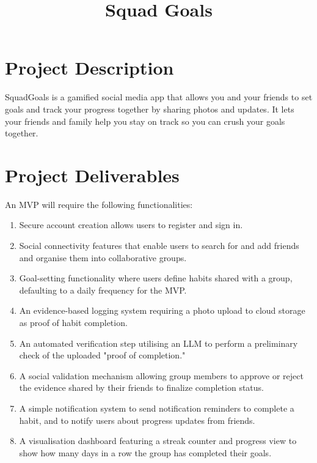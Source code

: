 \title{Squad Goals}

\maketitle
\section*{Project Description}
SquadGoals is a gamified social media app that allows you and your friends to set goals and track your progress together by sharing photos and updates. 
It lets your friends and family help you stay on track so you can crush your goals together.
\section*{Project Deliverables}
An MVP will require the following functionalities:
\begin{enumerate}
\item Secure account creation allows users to register and sign in.
\item Social connectivity features that enable users to search for and add friends and organise them into collaborative groups. 
\item Goal-setting functionality where users define habits shared with a group, defaulting to a daily frequency for the MVP. 
\item An evidence-based logging system requiring a photo upload to cloud storage as proof of habit completion. 
\item An automated verification step utilising an LLM to perform a preliminary check of the uploaded "proof of completion." 
\item A social validation mechanism allowing group members to approve or reject the evidence shared by their friends to finalize completion status. 
\item A simple notification system to send notification reminders to complete a habit, and to notify users about progress updates from friends.
\item A visualisation dashboard featuring a streak counter and progress view to show how many days in a row the group has completed their goals.
\end{enumerate}

